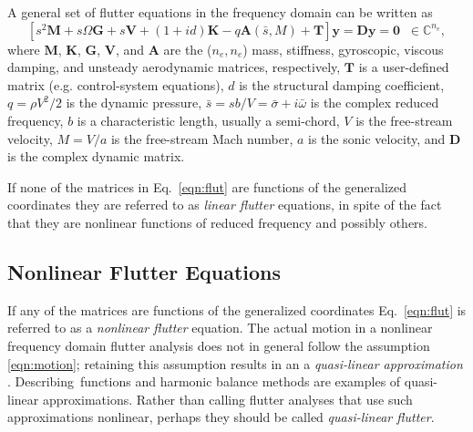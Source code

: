 \documentclass[11pt,openany,twoside]{book}
\numberwithin{equation}{section}		%
\newcommand{\Newterm}[1]{{\em #1}}	%
\newcommand{\Matrix}[1]{\boldsymbol{#1}}
\newcommand{\Vector}[1]{\boldsymbol{#1}}
\newcommand{\Eqn}[1]{Eq.\ \ref{#1}}  %
\begin{document}
A general set of flutter equations in the frequency domain
can be written as
\begin{equation}\label{eqn:flut}
\left[ s^2 \Matrix{M} + s \Omega\Matrix{G} + s \Matrix{V} +
 (1 + id) \Matrix{K} - q \Matrix{A} (\bar{s},M) + \Matrix{T} \right]
  \Vector{y} = \Matrix{D}\Vector{y} =
  \Vector{0} \; \; \in \mathbb{C}^{n_e},
\end{equation}
where
$\Matrix{M}$, $\Matrix{K}$, $\Matrix{G}$, $\Matrix{V}$, and $\Matrix{A}$
are the ($n_e,n_e$) mass, stiffness, gyroscopic, viscous damping, and
unsteady aerodynamic matrices, respectively,
$\Matrix{T}$ is a user-defined matrix (e.g. control-system equations),
$d$ is the structural damping coefficient,
$q = \rho V^2/2$ is the dynamic pressure,
$\bar{s} = sb/V = \bar{\sigma} + i\bar{\omega}$ is the complex reduced frequency,
$b$ is a characteristic length, usually a semi-chord,
$V$ is the free-stream velocity,
$M = V/a$ is the free-stream Mach number,
$a$ is the sonic velocity, and
$\Matrix{D}$ is the complex dynamic matrix.

If none of the matrices in \Eqn{eqn:flut} are functions of the generalized
coordinates they are referred to as \Newterm{linear flutter} equations,
in spite of the fact that they are nonlinear functions of reduced frequency
and possibly others.

\subsection{Nonlinear Flutter Equations}\label{sect:lco}
If any of the matrices are functions of the generalized coordinates
\Eqn{eqn:flut} is referred to as a \Newterm{nonlinear flutter} equation.
The actual motion in a nonlinear frequency domain flutter analysis 
does not in general follow the assumption \ref{eqn:motion}; retaining this
assumption results in an a
\Newterm{quasi-linear approximation} \cite{gelb1968multiple}.
Describing~functions and harmonic balance methods
are examples of quasi-linear approximations.
Rather than calling flutter analyses that use such approximations
nonlinear, perhaps they should be called \Newterm{quasi-linear flutter}.
\end{document}
